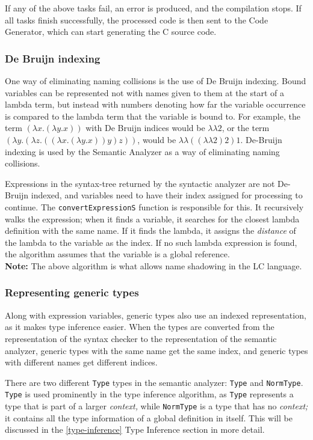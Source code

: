 \documentclass[12pt]{article}
\begin{document}
If any of the above tasks fail, an error is produced, and the compilation stops.
If all tasks finish successfully, the processed code is then sent to the Code
Generator, which can start generating the C source code.

\subsubsection{De Bruijn indexing}

One way of eliminating naming collisions is the use of De Bruijn indexing. Bound
variables can be represented not with names given to them at the start of a
lambda term, but instead with numbers denoting how far the variable occurrence
is compared to the lambda term that the variable is bound to. For example, the
term $(\lambda x. (\lambda y. x))$ with De Bruijn indices would be $\lambda
\lambda 2$, or the term $(\lambda y. (\lambda z. ((\lambda x. (\lambda y. x)) y)
z))$, would be $\lambda \lambda ((\lambda \lambda 2) 2) 1$. De-Bruijn indexing
is used by the Semantic Analyzer as a way of eliminating naming collisions.

Expressions in the syntax-tree returned by the syntactic analyzer are not
De-Bruijn indexed, and variables need to have their index assigned for
processing to continue. The \verb$convertExpressionS$ function is responsible
for this. It recursively walks the expression; when it finds a variable, it
searches for the closest lambda definition with the same name. If it finds the
lambda, it assigns the \emph{distance} of the lambda to the variable as the
index. If no such lambda expression is found, the algorithm assumes that the
variable is a global reference. \\
\textbf{Note:} The above algorithm is what allows name shadowing in the LC
language.

\subsubsection{Representing generic types}

Along with expression variables, generic types also use an indexed
representation, as it makes type inference easier. When the types are converted
from the representation of the syntax checker to the representation of the
semantic analyzer, generic types with the same name get the same index, and
generic types with different names get different indices.

There are two different \verb$Type$ types in the semantic analyzer: \verb$Type$
and \verb$NormType$. \verb$Type$ is used prominently in the type inference
algorithm, as \verb$Type$ represents a type that is part of a larger
\emph{context,} while \verb$NormType$ is a type that has no \emph{context;} it
contains all the type information of a global definition in itself. This will be
discussed in the \ref{type-inference} Type Inference section in more detail.
\end{document}
